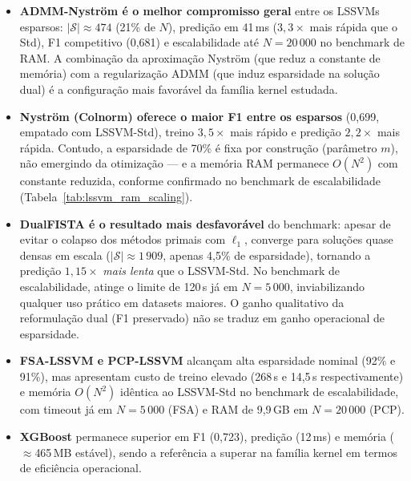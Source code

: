 \documentclass[12pt,a4paper]{article}
\begin{document}
\begin{itemize}
  \item \textbf{ADMM-Nyström é o melhor compromisso geral} entre os LSSVMs
        esparsos: $|\mathcal{S}| \approx 474$ (21\% de $N$), predição em
        41\,ms ($3{,}3{\times}$ mais rápida que o Std), F1 competitivo (0,681)
        e escalabilidade até $N{=}20\,000$ no benchmark de RAM. A combinação
        da aproximação Nyström (que reduz a constante de memória) com a
        regularização ADMM (que induz esparsidade na solução dual) é a
        configuração mais favorável da família kernel estudada.

  \item \textbf{Nyström (Colnorm) oferece o maior F1 entre os esparsos}
        (0,699, empatado com LSSVM-Std), treino $3{,}5{\times}$ mais rápido
        e predição $2{,}2{\times}$ mais rápida. Contudo, a esparsidade de
        70\% é fixa por construção (parâmetro $m$), não emergindo da
        otimização — e a memória RAM permanece $O(N^2)$ com constante
        reduzida, conforme confirmado no benchmark de escalabilidade
        (Tabela~\ref{tab:lssvm_ram_scaling}).

  \item \textbf{DualFISTA é o resultado mais desfavorável} do benchmark:
        apesar de evitar o colapso dos métodos primais com $\ell_1$,
        converge para soluções quase densas em escala
        ($|\mathcal{S}| \approx 1\,909$, apenas 4,5\% de esparsidade),
        tornando a predição $1{,}15{\times}$ \emph{mais lenta} que o
        LSSVM-Std. No benchmark de escalabilidade, atinge o limite de
        120\,s já em $N{=}5\,000$, inviabilizando qualquer uso prático
        em datasets maiores. O ganho qualitativo da reformulação dual
        (F1 preservado) não se traduz em ganho operacional de esparsidade.

  \item \textbf{FSA-LSSVM e PCP-LSSVM} alcançam alta esparsidade nominal
        (92\% e 91\%), mas apresentam custo de treino elevado (268\,s e
        14,5\,s respectivamente) e memória $O(N^2)$ idêntica ao LSSVM-Std
        no benchmark de escalabilidade, com timeout já em $N{=}5\,000$ (FSA)
        e RAM de 9,9\,GB em $N{=}20\,000$ (PCP).

  \item \textbf{XGBoost} permanece superior em F1 (0,723), predição (12\,ms)
        e memória ($\approx$465\,MB estável), sendo a referência a superar
        na família kernel em termos de eficiência operacional.
\end{itemize}
\end{document}
